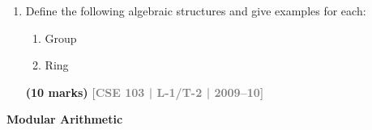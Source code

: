 \documentclass[12pt,a3paper]{article}
\newcommand{\yr}[1]{\hfill\textcolor{gray}{\small\textbf{[#1]}}}
\newcommand{\mk}[1]{\textcolor{orange!70!black}{\small\textbf{(#1 marks)}}}
\newcommand{\subtopic}[2]{%
  \vspace{10pt}
  \noindent\begin{tcolorbox}[colback=#1!8,colframe=#1,boxrule=0.6pt,arc=4pt,
    left=6pt,right=6pt,top=4pt,bottom=4pt]
    \small\bfseries\textcolor{#1}{#2}
  \end{tcolorbox}
  \vspace{2pt}
}
\begin{document}
\begin{enumerate}
\begin{center}
\begin{tabular}{cc}
        & \qquad\qquad\qquad %
        
        $\begin{array}{c|cccc}
            \odot & s & t & x & y \\
            \hline
            s & y & y & x & x \\
            t & y & y & x & x \\
            x & x & x & x & x \\
            y & x & x & x & x 
        \end{array}$

    \end{tabular}
\end{center}
\begin{enumerate}
  \item What is the inverse for $\oplus$?
  \item What is the zero element if $(R, \oplus, \odot)$ is a ring?
  \item Is $R$ commutative?
\end{enumerate}
\mk{10+2+2+3} \yr{CSE 103 | L-1/T-2 | 2013--14, 2010--11}



\item Define the following algebraic structures and give examples for each:
\begin{enumerate}
  \item Group
  \item Ring
\end{enumerate}
\mk{10} \yr{CSE 103 | L-1/T-2 | 2009--10}




\end{enumerate}
\subtopic{cC}{Modular Arithmetic}
\label{sub:s5-modular}
\end{document}
